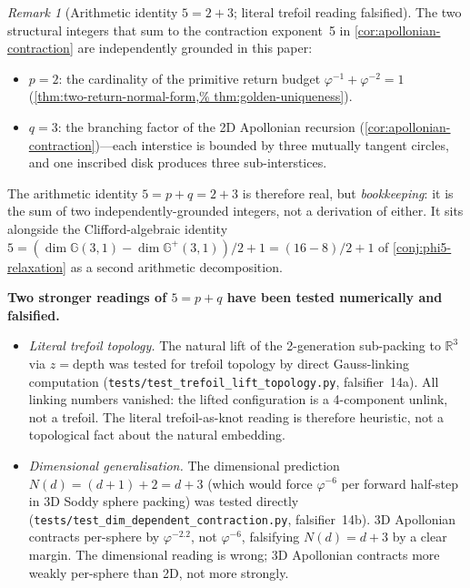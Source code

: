 \documentclass[11pt,a4paper]{article}
\theoremstyle{plain}
\theoremstyle{definition}
\theoremstyle{remark}
\newtheorem{remark}[theorem]{Remark}
\numberwithin{equation}{section}
\newcommand{\Cl}{\mathbb{G}}
\newcommand{\vp}{\varphi}
\begin{document}
\begin{remark}[Arithmetic identity \(5=2+3\); literal trefoil reading
falsified]
\label{rmk:trefoil-topology}
The two structural integers that sum to the contraction exponent~5
in \cref{cor:apollonian-contraction} are independently grounded in
this paper:

\begin{itemize}
\item \(p=2\): the cardinality of the primitive return budget
  \(\vp^{-1}+\vp^{-2}=1\) (\cref{thm:two-return-normal-form,%
  thm:golden-uniqueness}).
\item \(q=3\): the branching factor of the 2D Apollonian recursion
  (\cref{cor:apollonian-contraction})---each interstice is bounded
  by three mutually tangent circles, and one inscribed disk
  produces three sub-interstices.
\end{itemize}

The arithmetic identity \(5=p+q=2+3\) is therefore real, but
\emph{bookkeeping}: it is the sum of two independently-grounded
integers, not a derivation of either.  It sits alongside the
Clifford-algebraic identity
\(5=(\dim\Cl(3,1)-\dim\Cl^+(3,1))/2+1=(16-8)/2+1\) of
\cref{conj:phi5-relaxation} as a second arithmetic decomposition.

\textbf{Two stronger readings of \(5=p+q\) have been tested
numerically and falsified.}
\begin{itemize}
\item[(F14a)] \emph{Literal trefoil topology.}  The natural lift of
  the 2-generation sub-packing to \(\mathbb{R}^{3}\) via
  \(z=\mathrm{depth}\) was tested for trefoil topology by direct
  Gauss-linking computation
  (\texttt{tests/test\_trefoil\_lift\_topology.py}, falsifier~14a).
  All linking numbers vanished: the lifted configuration is a
  4-component unlink, not a trefoil.  The literal trefoil-as-knot
  reading is therefore heuristic, not a topological fact about the
  natural embedding.
\item[(F14b)] \emph{Dimensional generalisation.}  The dimensional
  prediction \(N(d)=(d+1)+2=d+3\) (which would force \(\vp^{-6}\)
  per forward half-step in 3D Soddy sphere packing) was tested
  directly (\texttt{tests/test\_dim\_dependent\_contraction.py},
  falsifier~14b).  3D Apollonian contracts per-sphere by
  \(\vp^{-2.2}\), not \(\vp^{-6}\), falsifying \(N(d)=d+3\) by a
  clear margin.  The dimensional reading is wrong; 3D Apollonian
  contracts more weakly per-sphere than 2D, not more strongly.
\end{itemize}


\end{remark}
\end{document}
